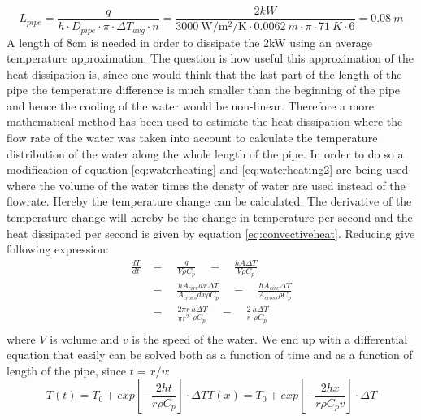\begin{equation}
L_{pipe} = \frac{q}{h\cdot D_{pipe} \cdot \pi \cdot \Delta T_{avg} \cdot n} = \frac{2kW}{\SI{3000}{\W\per\m^2\per\K} \cdot \SI{0.0062}{m} \cdot \pi \cdot \SI{71}{K} \cdot 6} = \SI{0.08}{m}
\end{equation}
A length of 8cm is needed in order to dissipate the 2kW using an average temperature approximation. The question is how useful this approximation of the heat dissipation is, since one would think that the last part of the length of the pipe the temperature difference is much smaller than the beginning of the pipe and hence the cooling of the water would be non-linear. Therefore a more mathematical method has been used to estimate the heat dissipation where the flow rate of the water was taken into account to calculate the temperature distribution of the water along the whole length of the pipe. In order to do so a modification of equation \ref{eq:waterheating} and \ref{eq:waterheating2} are being used where the volume of the water times the densty of water are used instead of the flowrate. Hereby the temperature change can be calculated. The derivative of the temperature change will hereby be the change in temperature per second and the heat dissipated per second is given by equation \ref{eq:convectiveheat}. Reducing give following expression:
\begin{equation}
\begin{aligned}
\frac{dT}{dt} & =  \quad {} \frac{q}{V\rho C_p} \quad = \quad \frac{hA\Delta T}{V\rho C_p}  \\
& = \quad\frac{hA_{circ} dx \Delta T}{A_{cross} dx \rho C_p}\quad =\quad \frac{hA_{circ} \Delta T}{A_{cross} \rho C_p} \\
& =\quad \frac{2\pi r}{\pi r^2} \frac{h\Delta T}{\rho C_p} \quad=\quad \frac{2}{r} \frac{h\Delta T}{\rho C_p} \\
\end{aligned}
\end{equation}
where $V$ is volume and $v$ is the speed of the water. We end up with a differential equation that easily can be solved both as a function of time and as a function of length of the pipe, since $t = x/v$: 
\begin{subequations}
\begin{equation}
T(t) =  T_0 + exp\left[-\frac{2ht}{r\rho C_p}\right]\cdot \Delta T
\end{equation}
\begin{equation}\label{eq:tdiff}
T(x) =  T_0 + exp\left[-\frac{2hx}{r\rho C_p v}\right]\cdot \Delta T
\end{equation}
\end{subequations}
